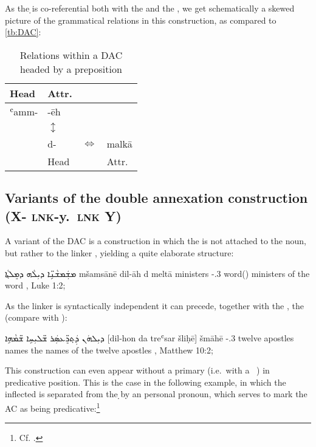 {{{{ 
As the \d \lnk* is co-referential both with the  and the \secn, we get schematically a skewed picture of the grammatical relations in this construction, as compared to \vref{tb:DAC}:



\begin{table}[h]
\centering
\begin{tabular}{l l l l}
\toprule
Head 	& Attr. & & \\
\midrule 
ʿamm- 	& -ēh 	& & \\
		& $\updownarrow $ & & \\
		& d- & $\Longleftrightarrow$ 	& malkā	 \\
\midrule
		& Head &				& Attr. \\
\bottomrule
\end{tabular}
\caption[Relations within a DAC headed by a preposition]{Relations within a DAC headed by a preposition}
\end{table}

\subsection[Variants of the DAC (X-\opt{y.{\poss}} \textsc{lnk}-y.\poss\ \textsc{lnk} Y)]{Variants of the double annexation construction (X- \textsc{lnk}-y.\poss\ \textsc{lnk} Y)}

A variant of the DAC is a construction in which the  is not attached to the \prim noun, but rather to the linker , yielding a quite elaborate structure: 

{ܡܫܲܡܫܵܢܹ̈ܐ ܕܝܼܠܵܗ ܕܡܸܠܬ݂ܵܐ}
{mšamsānē dil-āh d\cb{} meltā}
{ministers \lnk-\poss.3\fem{} \lnk\cb{} word(\fem)}
{ministers of the word}
{\Pesh, Luke 1:2; \cite[88, \S 112h]{MuraokaSyriac}}


As the linker is syntactically independent it can precede, together with the \secn, the \prim (compare with ):

{ܕܝܼܠܗܿܢ ܕܲܬ݂ܖܸ̈ܥܣܲܪ ܫ̈ܠܝܼܚܹܐ ܫ̈ܡܵܗܹܐ}
{[dil-hon da\cb{} treʿsar šliḥē] šmāhē}
{\lnk-\poss.3\mpl{} \lnk\cb{} twelve apostles names}
{the names of the twelve apostles}
{\Pesh, Matthew 10:2; \cite[88, \S 112h]{MuraokaSyriac}}

\largerpage[-1]
This construction can even appear without a primary (i.e.\ with a \zero\ \prim)  in predicative position. This is the case in the following example, in which the inflected  \lnk* is separated from the \d \lnk* by an  personal pronoun, which serves to mark the AC as being predicative:\footnote{Cf. \citet[33*, fn. 24]{MuraokaSyriac}.}

}}}}
